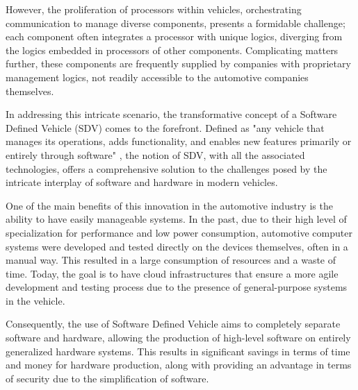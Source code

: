 However, the proliferation of processors within vehicles, orchestrating communication to manage diverse components, presents a formidable challenge; each component often integrates a processor with unique logics, diverging from the logics embedded in processors of other components. Complicating matters further, these components are frequently supplied by companies with proprietary management logics, not readily accessible to the automotive companies themselves.

In addressing this intricate scenario, the transformative concept of a Software Defined Vehicle (SDV) comes to the forefront. Defined as "any vehicle that manages its operations, adds functionality, and enables new features primarily or entirely through software"  \cite{blackberrySDV}, the notion of SDV, with all the associated technologies, offers a comprehensive solution to the challenges posed by the intricate interplay of software and hardware in modern vehicles.

One of the main benefits of this innovation in the automotive industry is the ability to have easily manageable systems. In the past, due to their high level of specialization for performance and low power consumption, automotive computer systems were developed and tested directly on the devices themselves, often in a manual way. This resulted in a large consumption of resources and a waste of time. Today, the goal is to have cloud infrastructures that ensure a more agile development and testing process due to the presence of general-purpose systems in the vehicle.

Consequently, the use of Software Defined Vehicle aims to completely separate software and hardware, allowing the production of high-level software on entirely generalized hardware systems. This results in significant savings in terms of time and money for hardware production, along with providing an advantage in terms of security due to the simplification of software.

